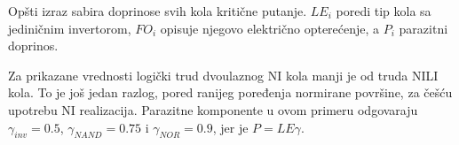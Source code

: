 Opšti izraz sabira doprinose svih kola kritične putanje. $LE_i$ poredi tip kola sa jediničnim invertorom, $FO_i$ opisuje njegovo električno opterećenje, a $P_i$ parazitni doprinos.

Za prikazane vrednosti logički trud dvoulaznog NI kola manji je od truda NILI kola. To je još jedan razlog, pored ranijeg poređenja normirane površine, za češću upotrebu NI realizacija. Parazitne komponente u ovom primeru odgovaraju $\gamma_{inv}=0.5$, $\gamma_{NAND}=0.75$ i $\gamma_{NOR}=0.9$, jer je $P=LE\gamma$.
